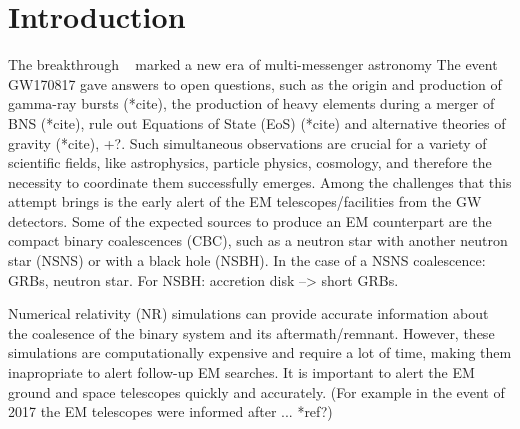 \section{Introduction}

The breakthrough ~\cite{LIGOScientific:2017ync} marked a new era of multi-messenger astronomy  The event GW170817 gave answers to open questions, such as the origin and production of gamma-ray bursts (*cite), the production of heavy elements during a merger of BNS (*cite), rule out Equations of State (EoS) (*cite) and alternative theories of gravity (*cite), +?. Such simultaneous observations are crucial for a variety of scientific fields, like astrophysics, particle physics, cosmology, and therefore the necessity to coordinate them successfully emerges. Among the challenges that this attempt brings is the early alert of the EM telescopes/facilities from the GW detectors. Some of the expected sources to produce an EM counterpart are the compact binary coalescences (CBC), such as a neutron star with another neutron star (NSNS) or with a black hole (NSBH). In the case of a NSNS coalescence: GRBs, neutron star. For NSBH: accretion disk --> short GRBs.    


Numerical relativity (NR) simulations can provide accurate information about the coalesence of the binary system and its aftermath/remnant. However, these simulations are computationally expensive and require a lot of time, making them inapropriate to alert follow-up EM searches. It is important to alert the EM ground and space telescopes quickly and accurately. (For example in the event of 2017 the EM telescopes were informed after ... *ref?)
   
